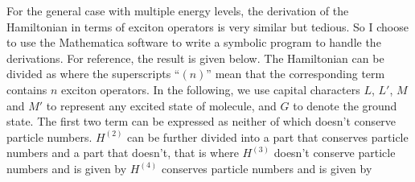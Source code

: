 For the general case with multiple energy levels, the derivation of the Hamiltonian in terms of exciton operators is
very similar but tedious. So I choose to use the Mathematica software\cite{mathematica} to write a symbolic program to handle the derivations. For 
reference, the result is given below. The Hamiltonian can be divided as 
where the superscripts ``$(n)$'' mean that the corresponding term contains $n$ exciton operators. In the following, we 
use capital characters $L$, $L'$, $M$ and $M'$ to represent any excited state of molecule, and $G$ to denote the 
ground state. The first two term can be expressed as
neither of which doesn't conserve particle numbers. 
$H^{(2)}$ can be further divided into a part that conserves particle numbers and a part that doesn't, that is
where
$H^{(3)}$ doesn't conserve particle numbers and  is given by
$H^{(4)}$ conserves particle numbers and is given by


